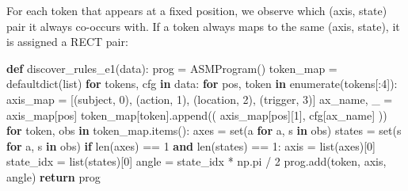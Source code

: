 \documentclass[
  twocolumn,
  10pt,
  a4paper]{article}
\newenvironment{Shaded}{}{}
\newcommand{\BuiltInTok}[1]{\textcolor[rgb]{0.00,0.50,0.00}{#1}}
\newcommand{\ControlFlowTok}[1]{\textcolor[rgb]{0.00,0.44,0.13}{\textbf{#1}}}
\newcommand{\DecValTok}[1]{\textcolor[rgb]{0.25,0.63,0.44}{#1}}
\newcommand{\KeywordTok}[1]{\textcolor[rgb]{0.00,0.44,0.13}{\textbf{#1}}}
\newcommand{\NormalTok}[1]{#1}
\newcommand{\OperatorTok}[1]{\textcolor[rgb]{0.40,0.40,0.40}{#1}}
\newcommand{\StringTok}[1]{\textcolor[rgb]{0.25,0.44,0.63}{#1}}
\begin{document}
For each token that appears at a fixed position, we observe which (axis,
state) pair it always co-occurs with. If a token always maps to the same
(axis, state), it is assigned a RECT pair:

\begin{Shaded}
\begin{Highlighting}[]
\KeywordTok{def}\NormalTok{ discover\_rules\_e1(data):}
\NormalTok{    prog }\OperatorTok{=}\NormalTok{ ASMProgram()}
\NormalTok{    token\_map }\OperatorTok{=}\NormalTok{ defaultdict(}\BuiltInTok{list}\NormalTok{)}
    \ControlFlowTok{for}\NormalTok{ tokens, cfg }\KeywordTok{in}\NormalTok{ data:}
        \ControlFlowTok{for}\NormalTok{ pos, token }\KeywordTok{in} \BuiltInTok{enumerate}\NormalTok{(tokens[:}\DecValTok{4}\NormalTok{]):}
\NormalTok{            axis\_map }\OperatorTok{=}\NormalTok{ [(}\StringTok{\textquotesingle{}subject\textquotesingle{}}\NormalTok{, }\DecValTok{0}\NormalTok{), (}\StringTok{\textquotesingle{}action\textquotesingle{}}\NormalTok{, }\DecValTok{1}\NormalTok{),}
\NormalTok{                        (}\StringTok{\textquotesingle{}location\textquotesingle{}}\NormalTok{, }\DecValTok{2}\NormalTok{), (}\StringTok{\textquotesingle{}trigger\textquotesingle{}}\NormalTok{, }\DecValTok{3}\NormalTok{)]}
\NormalTok{            ax\_name, \_ }\OperatorTok{=}\NormalTok{ axis\_map[pos]}
\NormalTok{            token\_map[token].append((}
\NormalTok{                axis\_map[pos][}\DecValTok{1}\NormalTok{], cfg[ax\_name]}
\NormalTok{            ))}
    \ControlFlowTok{for}\NormalTok{ token, obs }\KeywordTok{in}\NormalTok{ token\_map.items():}
\NormalTok{        axes }\OperatorTok{=} \BuiltInTok{set}\NormalTok{(a }\ControlFlowTok{for}\NormalTok{ a, s }\KeywordTok{in}\NormalTok{ obs)}
\NormalTok{        states }\OperatorTok{=} \BuiltInTok{set}\NormalTok{(s }\ControlFlowTok{for}\NormalTok{ a, s }\KeywordTok{in}\NormalTok{ obs)}
        \ControlFlowTok{if} \BuiltInTok{len}\NormalTok{(axes) }\OperatorTok{==} \DecValTok{1} \KeywordTok{and} \BuiltInTok{len}\NormalTok{(states) }\OperatorTok{==} \DecValTok{1}\NormalTok{:}
\NormalTok{            axis }\OperatorTok{=} \BuiltInTok{list}\NormalTok{(axes)[}\DecValTok{0}\NormalTok{]}
\NormalTok{            state\_idx }\OperatorTok{=} \BuiltInTok{list}\NormalTok{(states)[}\DecValTok{0}\NormalTok{]}
\NormalTok{            angle }\OperatorTok{=}\NormalTok{ state\_idx }\OperatorTok{*}\NormalTok{ np.pi }\OperatorTok{/} \DecValTok{2}
\NormalTok{            prog.add(token, axis, angle)}
    \ControlFlowTok{return}\NormalTok{ prog}
\end{Highlighting}
\end{Shaded}
\end{document}
